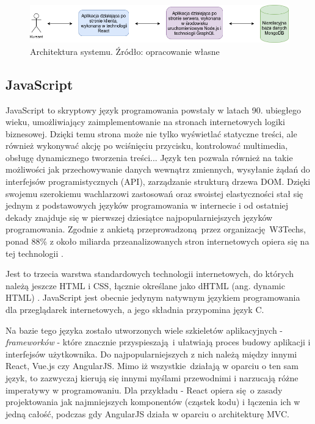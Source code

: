 \documentclass[12pt,twoside]{article}
\begin{document}
\begin{figure}[H]
	\centering
	\includegraphics[width=1\linewidth]{figures/app-architecture}
	\caption{Architektura systemu. Źródło: opracowanie własne}
	\label{fig:system-architecture}
\end{figure}

\subsection{JavaScript}

JavaScript to skryptowy język programowania powstały w latach 90. ubiegłego wieku, umożliwiający zaimplementowanie na stronach internetowych logiki biznesowej. Dzięki temu strona może nie tylko wyświetlać statyczne treści, ale również wykonywać akcję po wciśnięciu przycisku, kontrolować multimedia, obsługę dynamicznego tworzenia treści... Język ten pozwala również na takie możliwości jak przechowywanie danych wewnątrz zmiennych, wysyłanie żądań do interfejsów programistycznych (API), zarządzanie strukturą drzewa DOM. Dzięki swojemu szerokiemu wachlarzowi zastosowań oraz swoistej elastyczności stał się jednym z podstawowych języków programowania w internecie i od ostatniej dekady znajduje się w pierwszej dziesiątce najpopularniejszych języków programowania. Zgodnie z ankietą przeprowadzoną przez organizację W3Techs, ponad 88\% z około miliarda przeanalizowanych stron internetowych opiera się na tej technologii \cite{JavascriptPopularity}. 

Jest to trzecia warstwa standardowych technologii internetowych, do których należą jeszcze HTML i CSS, łącznie określane jako dHTML (ang. dynamic HTML) \cite{JS}. JavaScript jest obecnie jedynym natywnym językiem programowania dla przeglądarek internetowych, a jego składnia przypomina język C. 

Na bazie tego języka zostało utworzonych wiele szkieletów aplikacyjnych - \emph{frameworków} -  które znacznie przyspieszają i ułatwiają proces budowy aplikacji i interfejsów użytkownika. Do najpopularniejszych z nich należą między innymi React, Vue.js czy AngularJS. Mimo iż wszystkie działają w oparciu o ten sam język, to zazwyczaj kierują się innymi myślami przewodnimi i narzucają różne imperatywy w programowaniu. Dla przykładu - React opiera się o zasady projektowania jak najmniejszych komponentów (cząstek kodu) i łączenia ich w jedną całość, podczas gdy AngularJS działa w oparciu o architekturę MVC.
\end{document}
